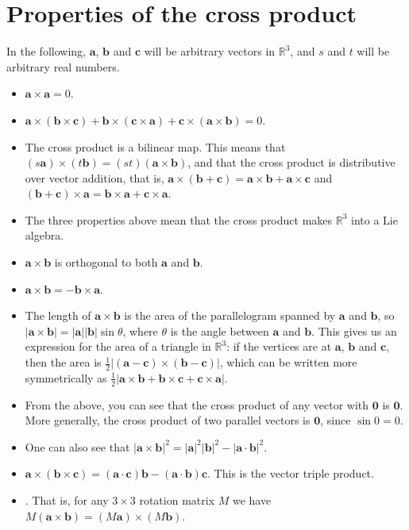 \documentclass[12pt]{article}
\def\R{\mathbb{R}}
\def\vec#1{\mathbf{#1}}   %
\begin{document}
\section*{Properties of the cross product}
In the following, $\vec{a}$, $\vec{b}$ and $\vec{c}$ will be arbitrary vectors in $\R^3$, and $s$ and $t$ will be arbitrary real numbers.
\begin{itemize}
\item $\vec{a}\times\vec{a}=0$.
\item $\vec{a}\times(\vec{b}\times\vec{c})+\vec{b}\times(\vec{c}\times\vec{a})
+\vec{c}\times(\vec{a}\times\vec{b})=0$.
\item The cross product is a bilinear map.
This means that $(s\vec{a})\times(t\vec{b})=(st)(\vec{a}\times\vec{b})$,
and that the cross product is distributive over vector addition,
that is, $\vec{a}\times(\vec{b}+\vec{c})=\vec{a}\times\vec{b}+\vec{a}\times\vec{c}$
and
$(\vec{b}+\vec{c})\times\vec{a}=\vec{b}\times\vec{a}+\vec{c}\times\vec{a}$.
\item The three properties above mean that the cross product makes $\R^3$ into a Lie algebra.
\item $\vec{a}\times\vec{b}$ is orthogonal to both $\vec{a}$ and $\vec{b}$.
\item $\vec{a}\times\vec{b}=-\vec{b}\times\vec{a}$.
\item The length of $\vec{a}\times\vec{b}$ is the area of the parallelogram spanned by $\vec{a}$ and $\vec{b}$, so $|\vec{a}\times\vec{b}|=|\vec{a}||\vec{b}|\sin\theta$, where $\theta$ is the angle between $\vec{a}$ and $\vec{b}$. This gives us an expression for the area of a triangle in $\R^3$: if the vertices are at $\vec{a}$, $\vec{b}$ and $\vec{c}$, then the area is $\frac{1}{2}|(\vec{a}-\vec{c})\times(\vec{b}-\vec{c})|$, which can be written more symmetrically as  $\frac{1}{2}|\vec{a}\times\vec{b}+\vec{b}\times\vec{c}+\vec{c}\times\vec{a}|$.
\item From the above, you can see that the cross product of any vector with $\vec{0}$ is $\vec{0}$. More generally, the cross product of two parallel vectors is $\vec{0}$, since $\sin 0 = 0$.
\item One can also see that $|\vec{a}\times \vec{b}|^2=|\vec{a}|^2|\vec{b}|^2-|\vec{a}\cdot \vec{b}|^2$.
\item $\vec{a}\times(\vec{b}\times\vec{c})
=(\vec{a}\cdot\vec{c})\vec{b}-(\vec{a}\cdot\vec{b})\vec{c}$.
This is the vector triple product.
\item {}.
That is, for any $3\times 3$ rotation matrix $M$ we have
$M(\vec{a}\times\vec{b})=(M\vec{a})\times(M\vec{b})$.
\end{itemize}
\end{document}
